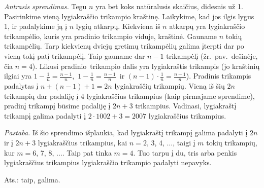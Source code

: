\documentclass[11pt,a4paper]{article}
\begin{document}
\emph{Antrasis sprendimas.} Tegu $n$ yra bet koks natūralusis skaičius, didesnis už 1. Pasirinkime vieną lygiakraščio trikampio kraštinę. Laikykime, kad jos ilgis lygus 1, ir padalykime ją į $n$ lygių atkarpų. Kiekviena iš $n$ atkarpų yra lygiakraščio trikampėlio, kuris yra pradinio trikampio viduje, kraštinė. Gauname $n$ tokių trikampėlių. Tarp kiekvienų dviejų gretimų trikampėlių galima įterpti dar po vieną tokį patį trikampėlį. Taip gauname dar $n-1$ trikampėlį (žr.~pav.~dešinėje, čia $n=4$). Likusi pradinio~tri\-kam\-pio dalis yra lygiakraštis trikampis (jo kraštinių ilgiai yra $1-\frac1n=\frac{n-1}n$, \,$1-\frac1n=\frac{n-1}n$~ir $(n-1)\cdot\frac1n=\frac{n-1}n$).
 Pradinis trikampis padalytas į $n+(n-1)+1=2n$ lygiakraščių trikampių. Vieną iš šių $2n$ trikampių dar padaliję į 4 lygiakraščius trikampius (kaip pirmajame sprendime), pradinį trikampį būsime padaliję į $2n+3$ trikampius. Vadinasi, lygiakraštį trikampį galima padalyti į $2\cdot1002+3=2007$ lygiakraščius trikampius. 


\emph{Pastaba.} Iš šio sprendimo išplaukia, kad lygiakraštį trikampį galima padalyti į $2n$ ir į $2n+3$ lygiakraščius trikampius, kai $n=2$, 3, 4, $\ldots$, taigi į $m$ tokių trikampių, kur $m=6$, 7, 8, $\ldots$. Taip pat tinka $m=4$. Tuo tarpu į du, tris arba penkis lygiakraščius trikampius lygiakraščio trikampio padalyti nepavyks. 

\begin{flushright}
Ats.: taip, galima.
\end{flushright}
 \vspace{0,7cm}
\end{document}
